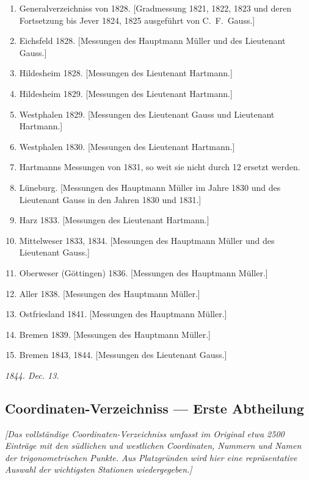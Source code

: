 \documentclass[12pt,a4paper]{article}
\begin{document}
\begin{enumerate}
\item[1)] Generalverzeichniss von 1828. [Gradmessung 1821, 1822, 1823 und deren Fortsetzung bis Jever
1824, 1825 ausgef\"uhrt von C.~F.~Gauss.]
\item[2)] Eichsfeld 1828. [Messungen des Hauptmann M\"uller und des Lieutenant Gauss.]
\item[3)] Hildesheim 1828. [Messungen des Lieutenant Hartmann.]
\item[4)] Hildesheim 1829. [Messungen des Lieutenant Hartmann.]
\item[5)] Westphalen 1829. [Messungen des Lieutenant Gauss und Lieutenant Hartmann.]
\item[6)] Westphalen 1830. [Messungen des Lieutenant Hartmann.]
\item[6*)] Hartmanns Messungen von 1831, so weit sie nicht durch 12 ersetzt werden.
\item[7)] L\"uneburg. [Messungen des Hauptmann M\"uller im Jahre 1830 und des Lieutenant Gauss in
den Jahren 1830 und 1831.]
\item[8)] Harz 1833. [Messungen des Lieutenant Hartmann.]
\item[9)] Mittelweser 1833, 1834. [Messungen des Hauptmann M\"uller und des Lieutenant Gauss.]
\item[10)] Oberweser (G\"ottingen) 1836. [Messungen des Hauptmann M\"uller.]
\item[11)] Aller 1838. [Messungen des Hauptmann M\"uller.]
\item[12)] Ostfriesland 1841. [Messungen des Hauptmann M\"uller.]
\item[13)] Bremen 1839. [Messungen des Hauptmann M\"uller.]
\item[14)] Bremen 1843, 1844. [Messungen des Lieutenant Gauss.]
\end{enumerate}

\hfill\textit{1844. Dec. 13.}

\newpage
\subsection*{Coordinaten-Verzeichniss --- Erste Abtheilung}

\textit{[Das vollst\"andige Coordinaten-Verzeichniss umfasst im Original etwa 2500
Eintr\"age mit den s\"udlichen und westlichen Coordinaten, Nummern und Namen
der trigonometrischen Punkte. Aus Platzgr\"unden wird hier eine repr\"asentative
Auswahl der wichtigsten Stationen wiedergegeben.]}
\end{document}
